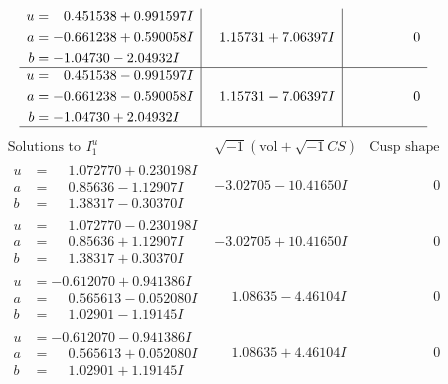 \documentclass[1p]{elsarticle_modified}
\theoremstyle{definition}
\newcommand{\I}{\sqrt{-1}}
\begin{document}
$$\begin{array}{c|c|c}
\begin{aligned}
u &= \phantom{-}0.451538 + 0.991597 I \\
a &= -0.661238 + 0.590058 I \\
b &= -1.04730 - 2.04932 I\end{aligned}
 & \phantom{-}1.15731 + 7.06397 I & \phantom{-0.000000 } 0 \\ \hline\begin{aligned}
u &= \phantom{-}0.451538 - 0.991597 I \\
a &= -0.661238 - 0.590058 I \\
b &= -1.04730 + 2.04932 I\end{aligned}
 & \phantom{-}1.15731 - 7.06397 I & \phantom{-0.000000 } 0\\
 \hline 
 \end{array}$$\newpage$$\begin{array}{c|c|c}  
\text{Solutions to }I^u_{1}& \I (\text{vol} + \sqrt{-1}CS) & \text{Cusp shape}\\
 \hline 
\begin{aligned}
u &= \phantom{-}1.072770 + 0.230198 I \\
a &= \phantom{-}0.85636 - 1.12907 I \\
b &= \phantom{-}1.38317 - 0.30370 I\end{aligned}
 & -3.02705 - 10.41650 I & \phantom{-0.000000 } 0 \\ \hline\begin{aligned}
u &= \phantom{-}1.072770 - 0.230198 I \\
a &= \phantom{-}0.85636 + 1.12907 I \\
b &= \phantom{-}1.38317 + 0.30370 I\end{aligned}
 & -3.02705 + 10.41650 I & \phantom{-0.000000 } 0 \\ \hline\begin{aligned}
u &= -0.612070 + 0.941386 I \\
a &= \phantom{-}0.565613 - 0.052080 I \\
b &= \phantom{-}1.02901 - 1.19145 I\end{aligned}
 & \phantom{-}1.08635 - 4.46104 I & \phantom{-0.000000 } 0 \\ \hline\begin{aligned}
u &= -0.612070 - 0.941386 I \\
a &= \phantom{-}0.565613 + 0.052080 I \\
b &= \phantom{-}1.02901 + 1.19145 I\end{aligned}
 & \phantom{-}1.08635 + 4.46104 I & \phantom{-0.000000 } 0 \\ \hline\begin{aligned}

\end{aligned}
\end{array}$$
\end{document}
